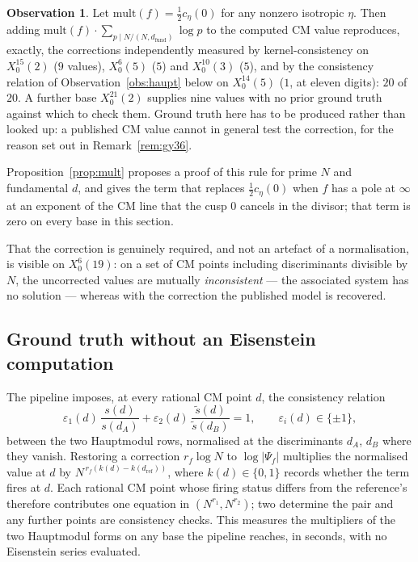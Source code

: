 \documentclass[11pt,reqno]{amsart}
\theoremstyle{plain}
\theoremstyle{definition}
\newtheorem{observation}[theorem]{Observation}
\begin{document}
\begin{observation}\label{obs:mult}
Let $\mathrm{mult}(f)=\tfrac12 c_\eta(0)$ for any nonzero isotropic $\eta$. Then adding
$\mathrm{mult}(f)\cdot\sum_{p\mid N/(N,d_{\mathrm{fund}})}\log p$ to the computed CM value
reproduces, exactly, the corrections independently measured by kernel-consistency on
$X_0^{15}(2)$ ($9$ values), $X_0^{6}(5)$ ($5$) and $X_0^{10}(3)$ ($5$), and by the consistency
relation of Observation~\ref{obs:haupt} below on $X_0^{14}(5)$ ($1$, at eleven digits): $20$ of
$20$. A further base $X_0^{21}(2)$ supplies nine values with no prior ground truth against which
to check them. Ground truth here has to be produced rather than looked up: a published CM value
cannot in general test the correction, for the reason set out in Remark~\ref{rem:gy36}.
\end{observation}

Proposition~\ref{prop:mult} proposes a proof of this rule for prime $N$ and fundamental $d$, and gives the term
that replaces $\tfrac12c_\eta(0)$ when $f$ has a pole at $\infty$ at an exponent of the CM line
that the cusp $0$ cancels in the divisor; that term is zero on every base in this section.

That the correction is genuinely required, and not an artefact of a normalisation, is visible on
$X_0^{6}(19)$: on a set of CM points including discriminants divisible by $N$, the uncorrected
values are mutually \emph{inconsistent} --- the associated system has no solution --- whereas with
the correction the published model is recovered.

\subsection*{Ground truth without an Eisenstein computation}
The pipeline imposes, at every rational CM point $d$, the consistency relation
\begin{equation}\label{eq:haupt}
  \varepsilon_1(d)\,\frac{s(d)}{s(d_A)}+\varepsilon_2(d)\,\frac{\tilde s(d)}{\tilde s(d_B)}=1,
  \qquad \varepsilon_i(d)\in\{\pm1\},
\end{equation}
between the two Hauptmodul rows, normalised at the discriminants $d_A$, $d_B$ where they vanish.
Restoring a correction $r_f\log N$ to $\log\lvert\Psi_f\rvert$ multiplies the normalised value at
$d$ by $N^{\,r_f(k(d)-k(d_{\mathrm{ref}}))}$, where $k(d)\in\{0,1\}$ records whether the term
fires at $d$. Each rational CM point whose firing status differs from the reference's therefore
contributes one equation in $(N^{r_1},N^{r_2})$; two determine the pair and any further points are
consistency checks. This measures the multipliers of the two Hauptmodul forms on any base the
pipeline reaches, in seconds, with no Eisenstein series evaluated.
\end{document}

